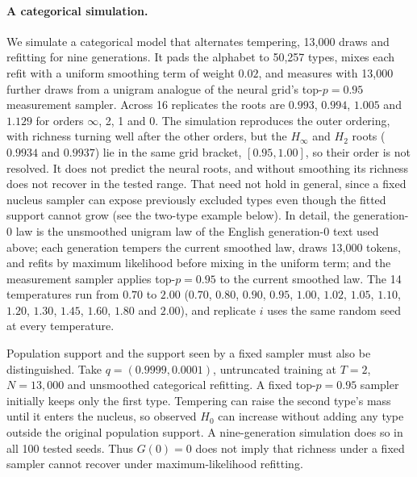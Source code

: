\documentclass[10pt]{article}
\theoremstyle{plain}
\theoremstyle{definition}
\newcommand{\Htwo}{H_2}
\newcommand{\Hinf}{H_\infty}
\begin{document}
\paragraph{A categorical simulation.} We simulate a categorical model that alternates tempering,
13,000 draws and refitting
for nine generations. It pads the alphabet to 50,257 types, mixes each refit with a uniform
smoothing term of weight $0.02$, and measures with 13,000 further draws from a unigram analogue of the neural grid's top-$p=0.95$ measurement
sampler. Across 16 replicates the roots are $0.993$, $0.994$, $1.005$ and $1.129$ for orders
$\infty$, 2, 1 and 0. The simulation reproduces the outer ordering, with richness turning well
after the other orders, but the $\Hinf$ and $\Htwo$ roots ($0.9934$ and $0.9937$) lie in the same
grid bracket, $[0.95,1.00]$, so their order is not resolved. It does not predict the neural
roots, and without smoothing its richness does not recover in the tested range. That need not
hold in general, since a fixed nucleus sampler can expose previously excluded types even though the fitted support cannot grow (see the two-type example below). In detail, the generation-0 law is
the unsmoothed unigram law of the English generation-0 text used above; each generation tempers the current smoothed law, draws 13,000
tokens, and refits by maximum likelihood before mixing in the uniform term; and the measurement
sampler applies top-$p=0.95$ to the current smoothed law. The 14 temperatures run from $0.70$ to $2.00$
($0.70$, $0.80$, $0.90$, $0.95$, $1.00$, $1.02$, $1.05$, $1.10$, $1.20$, $1.30$, $1.45$, $1.60$,
$1.80$ and $2.00$), and replicate $i$ uses the same random seed at every temperature.

Population support and the support seen by a fixed sampler must also be distinguished. Take $q=(0.9999,0.0001)$, untruncated
training at $T=2$, $N=13{,}000$ and unsmoothed categorical refitting. A fixed top-$p=0.95$ sampler initially keeps
only the first type. Tempering can raise the second type's mass until it enters the nucleus, so
observed $H_0$ can increase without adding any type outside the original population support. A
nine-generation simulation does so in all 100 tested seeds. Thus $G(0)=0$ does not imply that
richness under a fixed sampler cannot recover under maximum-likelihood refitting.
\end{document}
